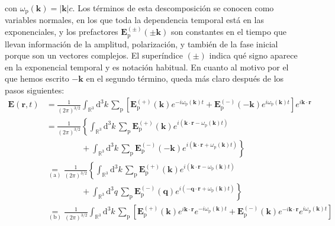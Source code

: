 con \(\omega_\mathrm{p}(\mathbf{k}) = |\mathbf{k}|c\). Los términos de esta descomposición se conocen como variables normales, en los que toda la dependencia temporal está en las exponenciales, y los prefactores \(\mathbf{E}^{(\pm)}_\mathrm{p}(\pm\mathbf{k})\) son constantes en el tiempo que llevan información de la amplitud, polarización, y también de la fase inicial porque son un vectores complejos. El superíndice \((\pm)\) indica qué signo aparece en la exponencial temporal y es notación habitual. En cuanto al motivo por el que hemos escrito \(-\mathbf{k}\) en el segundo término, queda más claro después de los pasos siguientes:
\begin{align*}
    \mathbf{E}(\mathbf{r}, t) &= \frac{1}{(2\pi)^{3/2}}\int_{\mathbb{R}^3}\mathrm{d}^3k\, \sum_\mathrm{p}\left[\mathbf{E}^{(+)}_\mathrm{p}(\mathbf{k}) e^{-i\omega_\mathrm{p}(\mathbf{k}) t} + \mathbf{E}^{(-)}_\mathrm{p}(-\mathbf{k}) e^{i\omega_\mathrm{p}(\mathbf{k}) t}\right] e^{i\mathbf{k}\cdot\mathbf{r}} \\
    &=\frac{1}{(2\pi)^{3/2}}\left\{\int_{\mathbb{R}^3}\mathrm{d}^3k\, \sum_\mathrm{p}\mathbf{E}^{(+)}_\mathrm{p}(\mathbf{k}) e^{i(\mathbf{k}\cdot\mathbf{r}-\omega_\mathrm{p}(\mathbf{k}) t)} \right. \\
    &\phantom{=\frac{1}{(2\pi)^{3/2}}}+\left.\int_{\mathbb{R}^3}\mathrm{d}^3k\, \sum_\mathrm{p} \mathbf{E}^{(-)}_\mathrm{p}(-\mathbf{k}) e^{i(\mathbf{k}\cdot\mathbf{r}+\omega_\mathrm{p}(\mathbf{k}) t)} \right\}\\
    &\underset{\mathrm{(a)}}{=}\frac{1}{(2\pi)^{3/2}}\left\{\int_{\mathbb{R}^3}\mathrm{d}^3k\,\sum_\mathrm{p} \mathbf{E}^{(+)}_\mathrm{p}(\mathbf{k}) e^{i(\mathbf{k}\cdot\mathbf{r}-\omega_\mathrm{p}(\mathbf{k}) t)}\right.\\
    &\phantom{=\frac{1}{(2\pi)^{3/2}}}+ \left.\int_{\mathbb{R}^3}\mathrm{d}^3q\,\sum_\mathrm{p} \mathbf{E}^{(-)}_\mathrm{p}(\mathbf{q}) e^{i(-\mathbf{q}\cdot\mathbf{r}+\omega_\mathrm{p}(\mathbf{k}) t)} \right\}\\
    &\underset{\mathrm{(b)}}{=}\frac{1}{(2\pi)^{3/2}}\int_{\mathbb{R}^3}\mathrm{d}^3k\, \sum_\mathrm{p}\left[\mathbf{E}^{(+)}_\mathrm{p}(\mathbf{k}) e^{i\mathbf{k}\cdot\mathbf{r}}e^{-i\omega_\mathrm{p}(\mathbf{k}) t} + \mathbf{E}^{(-)}_\mathrm{p}(\mathbf{k}) e^{-i\mathbf{k}\cdot\mathbf{r}}e^{i\omega_\mathrm{p}(\mathbf{k}) t} \right]
\end{align*}
